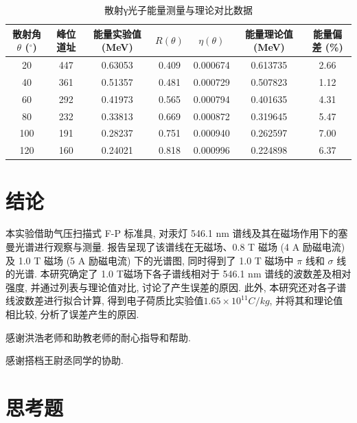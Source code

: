 \documentclass[font=default]{mpltx}
\begin{document}
      \begin{table}[htbp]
        \centering
        \caption{散射γ光子能量测量与理论对比数据} %
        \begin{tabular}{ccccccc}
            \toprule %
            散射角 $\theta$ ($^\circ$) & 峰位道址 & 能量实验值 (MeV) & $R(\theta)$ & $\eta(\theta)$ & 能量理论值 (MeV) & 能量偏差 (\%) \\
            \midrule %
            20 & 447 & 0.63053 & 0.409 & 0.000674 & 0.613735 & 2.66 \\
            40 & 361 & 0.51357 & 0.481 & 0.000729 & 0.507823 & 1.12 \\
            60 & 292 & 0.41973 & 0.565 & 0.000794 & 0.401635 & 4.31 \\
            80 & 232 & 0.33813 & 0.669 & 0.000872 & 0.319645 & 5.47 \\
            100 & 191 & 0.28237 & 0.751 & 0.000940 & 0.262597 & 7.00 \\
            120 & 160 & 0.24021 & 0.818 & 0.000996 & 0.224898 & 6.37 \\
            \bottomrule %
        \end{tabular}
        \label{tab:gamma_scattering_energy} %
      \end{table}



 
\section{结论}
  本实验借助气压扫描式 F-P 标准具, 
  对汞灯 546.1 nm 谱线及其在磁场作用下的塞曼光谱进行观察与测量.
  报告呈现了该谱线在无磁场、0.8 T 磁场 (4 A 励磁电流) 及 1.0 T 磁场 (5 A 励磁电流) 下的光谱图, 
  同时得到了 1.0 T 磁场中 $\pi$ 线和 $\sigma$ 线的光谱. 
  本研究确定了 1.0 T磁场下各子谱线相对于 546.1 nm 谱线的波数差及相对强度, 
  并通过列表与理论值对比, 讨论了产生误差的原因.
  此外, 本研究还对各子谱线波数差进行拟合计算, 得到电子荷质比实验值$1.65 \times 10^{11} C/kg$, 并将其和理论值相比较, 分析了误差产生的原因.

\begin{acknowledgments}
  感谢洪浩老师和助教老师的耐心指导和帮助.
  \par
  感谢搭档王尉丞同学的协助.
\end{acknowledgments}



\clearpage %
\appendix %
\section{思考题}\label{app:exercise}
\end{document}
